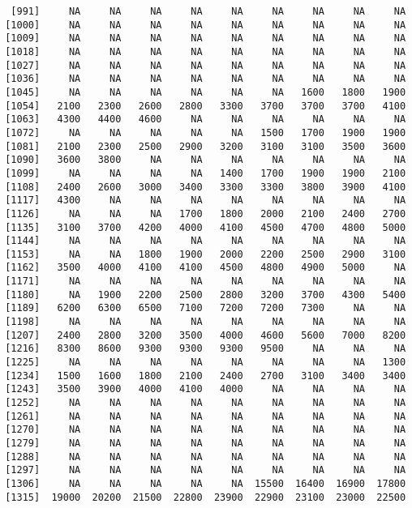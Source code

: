 \documentclass[]{article}
\begin{document}
\begin{verbatim}
  [991]     NA     NA     NA     NA     NA     NA     NA     NA     NA
 [1000]     NA     NA     NA     NA     NA     NA     NA     NA     NA
 [1009]     NA     NA     NA     NA     NA     NA     NA     NA     NA
 [1018]     NA     NA     NA     NA     NA     NA     NA     NA     NA
 [1027]     NA     NA     NA     NA     NA     NA     NA     NA     NA
 [1036]     NA     NA     NA     NA     NA     NA     NA     NA     NA
 [1045]     NA     NA     NA     NA     NA     NA   1600   1800   1900
 [1054]   2100   2300   2600   2800   3300   3700   3700   3700   4100
 [1063]   4300   4400   4600     NA     NA     NA     NA     NA     NA
 [1072]     NA     NA     NA     NA     NA   1500   1700   1900   1900
 [1081]   2100   2300   2500   2900   3200   3100   3100   3500   3600
 [1090]   3600   3800     NA     NA     NA     NA     NA     NA     NA
 [1099]     NA     NA     NA     NA   1400   1700   1900   1900   2100
 [1108]   2400   2600   3000   3400   3300   3300   3800   3900   4100
 [1117]   4300     NA     NA     NA     NA     NA     NA     NA     NA
 [1126]     NA     NA     NA   1700   1800   2000   2100   2400   2700
 [1135]   3100   3700   4200   4000   4100   4500   4700   4800   5000
 [1144]     NA     NA     NA     NA     NA     NA     NA     NA     NA
 [1153]     NA     NA   1800   1900   2000   2200   2500   2900   3100
 [1162]   3500   4000   4100   4100   4500   4800   4900   5000     NA
 [1171]     NA     NA     NA     NA     NA     NA     NA     NA     NA
 [1180]     NA   1900   2200   2500   2800   3200   3700   4300   5400
 [1189]   6200   6300   6500   7100   7200   7200   7300     NA     NA
 [1198]     NA     NA     NA     NA     NA     NA     NA     NA     NA
 [1207]   2400   2800   3200   3500   4000   4600   5600   7000   8200
 [1216]   8300   8600   9300   9300   9300   9500     NA     NA     NA
 [1225]     NA     NA     NA     NA     NA     NA     NA     NA   1300
 [1234]   1500   1600   1800   2100   2400   2700   3100   3400   3400
 [1243]   3500   3900   4000   4100   4000     NA     NA     NA     NA
 [1252]     NA     NA     NA     NA     NA     NA     NA     NA     NA
 [1261]     NA     NA     NA     NA     NA     NA     NA     NA     NA
 [1270]     NA     NA     NA     NA     NA     NA     NA     NA     NA
 [1279]     NA     NA     NA     NA     NA     NA     NA     NA     NA
 [1288]     NA     NA     NA     NA     NA     NA     NA     NA     NA
 [1297]     NA     NA     NA     NA     NA     NA     NA     NA     NA
 [1306]     NA     NA     NA     NA     NA  15500  16400  16900  17800
 [1315]  19000  20200  21500  22800  23900  22900  23100  23000  22500

\end{verbatim}
\end{document}
